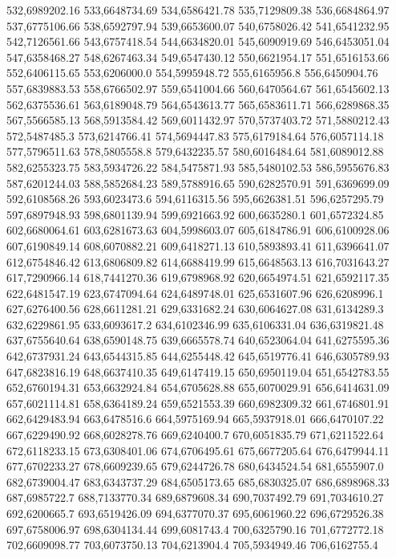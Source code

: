 532,6989202.16
533,6648734.69
534,6586421.78
535,7129809.38
536,6684864.97
537,6775106.66
538,6592797.94
539,6653600.07
540,6758026.42
541,6541232.95
542,7126561.66
543,6757418.54
544,6634820.01
545,6090919.69
546,6453051.04
547,6358468.27
548,6267463.34
549,6547430.12
550,6621954.17
551,6516153.66
552,6406115.65
553,6206000.0
554,5995948.72
555,6165956.8
556,6450904.76
557,6839883.53
558,6766502.97
559,6541004.66
560,6470564.67
561,6545602.13
562,6375536.61
563,6189048.79
564,6543613.77
565,6583611.71
566,6289868.35
567,5566585.13
568,5913584.42
569,6011432.97
570,5737403.72
571,5880212.43
572,5487485.3
573,6214766.41
574,5694447.83
575,6179184.64
576,6057114.18
577,5796511.63
578,5805558.8
579,6432235.57
580,6016484.64
581,6089012.88
582,6255323.75
583,5934726.22
584,5475871.93
585,5480102.53
586,5955676.83
587,6201244.03
588,5852684.23
589,5788916.65
590,6282570.91
591,6369699.09
592,6108568.26
593,6023473.6
594,6116315.56
595,6626381.51
596,6257295.79
597,6897948.93
598,6801139.94
599,6921663.92
600,6635280.1
601,6572324.85
602,6680064.61
603,6281673.63
604,5998603.07
605,6184786.91
606,6100928.06
607,6190849.14
608,6070882.21
609,6418271.13
610,5893893.41
611,6396641.07
612,6754846.42
613,6806809.82
614,6688419.99
615,6648563.13
616,7031643.27
617,7290966.14
618,7441270.36
619,6798968.92
620,6654974.51
621,6592117.35
622,6481547.19
623,6747094.64
624,6489748.01
625,6531607.96
626,6208996.1
627,6276400.56
628,6611281.21
629,6331682.24
630,6064627.08
631,6134289.3
632,6229861.95
633,6093617.2
634,6102346.99
635,6106331.04
636,6319821.48
637,6755640.64
638,6590148.75
639,6665578.74
640,6523064.04
641,6275595.36
642,6737931.24
643,6544315.85
644,6255448.42
645,6519776.41
646,6305789.93
647,6823816.19
648,6637410.35
649,6147419.15
650,6950119.04
651,6542783.55
652,6760194.31
653,6632924.84
654,6705628.88
655,6070029.91
656,6414631.09
657,6021114.81
658,6364189.24
659,6521553.39
660,6982309.32
661,6746801.91
662,6429483.94
663,6478516.6
664,5975169.94
665,5937918.01
666,6470107.22
667,6229490.92
668,6028278.76
669,6240400.7
670,6051835.79
671,6211522.64
672,6118233.15
673,6308401.06
674,6706495.61
675,6677205.64
676,6479944.11
677,6702233.27
678,6609239.65
679,6244726.78
680,6434524.54
681,6555907.0
682,6739004.47
683,6343737.29
684,6505173.65
685,6830325.07
686,6898968.33
687,6985722.7
688,7133770.34
689,6879608.34
690,7037492.79
691,7034610.27
692,6200665.7
693,6519426.09
694,6377070.37
695,6061960.22
696,6729526.38
697,6758006.97
698,6304134.44
699,6081743.4
700,6325790.16
701,6772772.18
702,6609098.77
703,6073750.13
704,6213904.4
705,5934949.46
706,6162755.4
